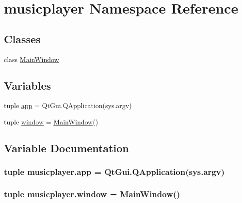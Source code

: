 \hypertarget{namespacemusicplayer}{}\section{musicplayer Namespace Reference}
\label{namespacemusicplayer}
\subsection*{Classes}
\begin{DoxyCompactItemize}
\item 
class \hyperlink{classmusicplayer_1_1MainWindow}{Main\+Window}
\end{DoxyCompactItemize}
\subsection*{Variables}
\begin{DoxyCompactItemize}
\item 
tuple \hyperlink{namespacemusicplayer_a2e3d14a593d3aad59d224913c5b5012a}{app} = Qt\+Gui.\+Q\+Application(sys.\+argv)
\item 
tuple \hyperlink{namespacemusicplayer_a938e853821ccdf83ddddba4fcdb7b35e}{window} = \hyperlink{classmusicplayer_1_1MainWindow}{Main\+Window}()
\end{DoxyCompactItemize}


\subsection{Variable Documentation}
\hypertarget{namespacemusicplayer_a2e3d14a593d3aad59d224913c5b5012a}{}
\subsubsection[{app}]{\setlength{\rightskip}{0pt plus 5cm}tuple musicplayer.\+app = Qt\+Gui.\+Q\+Application(sys.\+argv)}\label{namespacemusicplayer_a2e3d14a593d3aad59d224913c5b5012a}
\hypertarget{namespacemusicplayer_a938e853821ccdf83ddddba4fcdb7b35e}{}
\subsubsection[{window}]{\setlength{\rightskip}{0pt plus 5cm}tuple musicplayer.\+window = {\bf Main\+Window}()}\label{namespacemusicplayer_a938e853821ccdf83ddddba4fcdb7b35e}
